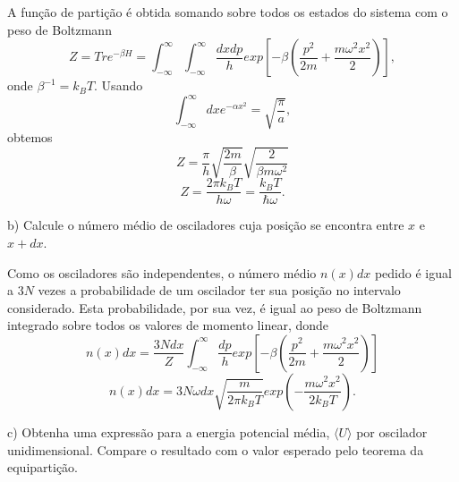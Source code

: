 \begin{enumerate}[start=1,label={\bfseries Q\arabic*.}]
\resposta A função de partição é obtida somando sobre todos os estados do sistema com o peso de Boltzmann
%
\begin{equation}
  Z = Tr e^{-\beta H} = \int_{-\infty}^{\infty} \int_{-\infty}^{\infty} \frac{dx dp}{h} exp \left[ - \beta \left( \frac{p^{2}}{2m} + \frac{m \omega^{2} x^{2} }{2}  \right)  \right] ,
\end{equation}
%
onde $\beta^{-1} = k_{B} T$. Usando
%
\begin{equation}
  \int_{-\infty}^{\infty} dx e^{-\alpha x^{2}} = \sqrt{\frac{\pi}{a}} ,
\end{equation}
%
obtemos
%
\begin{equation}
  Z = \frac{\pi}{h} \sqrt{ \frac{2m}{\beta} } \sqrt{\frac{2}{\beta m \omega^{2}}}
\end{equation}
%
\begin{equation}
  Z = \frac{2 \pi k_{B} T}{h \omega} = \frac{k_{B} T}{\hbar \omega} .
\end{equation}



b) Calcule o número médio de osciladores cuja posição se encontra entre $x$ e $x + dx$.

\resposta Como os osciladores são independentes, o número médio $n(x)dx$ pedido é igual a $3N$ vezes a probabilidade de um oscilador ter sua posição no intervalo considerado. Esta probabilidade, por sua vez, é igual ao peso de Boltzmann integrado sobre todos os valores de momento linear, donde
%
\begin{equation}
  n(x) dx = \frac{3N dx}{Z} \int_{-\infty}^{\infty} \frac{dp}{h} exp \left[ - \beta \left( \frac{p^{2}}{2m} + \frac{m \omega^{2} x^{2}}{2} \right) \right]
\end{equation}
%
\begin{equation}
  n(x) dx = 3N\omega dx  \sqrt{\frac{m}{2 \pi k_{B} T}}   exp \left( - \frac{ m \omega^{2} x^{2} }{2 k_{B} T} \right) .
\end{equation}


c) Obtenha uma expressão para a energia potencial média, $\langle U\rangle$ por oscilador unidimensional. Compare o resultado com o valor esperado pelo teorema da equipartição.


\end{enumerate}
